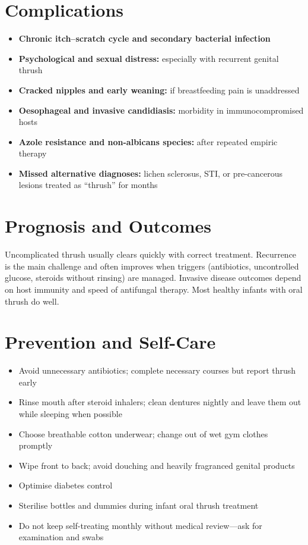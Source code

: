 \section*{Complications}
\begin{itemize}
    \item \textbf{Chronic itch--scratch cycle and secondary bacterial infection}
    \item \textbf{Psychological and sexual distress:} especially with recurrent genital thrush
    \item \textbf{Cracked nipples and early weaning:} if breastfeeding pain is unaddressed
    \item \textbf{Oesophageal and invasive candidiasis:} morbidity in immunocompromised hosts
    \item \textbf{Azole resistance and non-albicans species:} after repeated empiric therapy
    \item \textbf{Missed alternative diagnoses:} lichen sclerosus, STI, or pre-cancerous lesions treated as ``thrush'' for months
\end{itemize}

\section*{Prognosis and Outcomes}
Uncomplicated thrush usually clears quickly with correct treatment. Recurrence is the main challenge and often improves when triggers (antibiotics, uncontrolled glucose, steroids without rinsing) are managed. Invasive disease outcomes depend on host immunity and speed of antifungal therapy. Most healthy infants with oral thrush do well.

\section*{Prevention and Self-Care}
\begin{itemize}
    \item Avoid unnecessary antibiotics; complete necessary courses but report thrush early
    \item Rinse mouth after steroid inhalers; clean dentures nightly and leave them out while sleeping when possible
    \item Choose breathable cotton underwear; change out of wet gym clothes promptly
    \item Wipe front to back; avoid douching and heavily fragranced genital products
    \item Optimise diabetes control
    \item Sterilise bottles and dummies during infant oral thrush treatment
    \item Do not keep self-treating monthly without medical review---ask for examination and swabs
\end{itemize}

